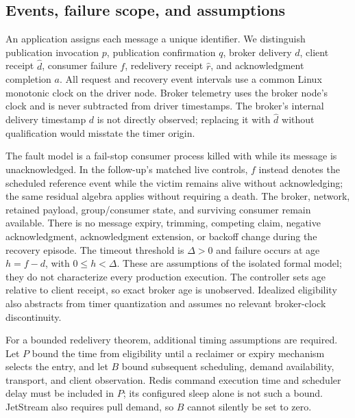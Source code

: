 \subsection{Events, failure scope, and assumptions}

An application assigns each message a unique identifier. We distinguish publication invocation $p$, publication confirmation $q$, broker delivery $d$, client receipt $\widehat d$, consumer failure $f$, redelivery receipt $\widehat r$, and acknowledgment completion $a$. All request and recovery event intervals use a common Linux monotonic clock on the driver node. Broker telemetry uses the broker node's clock and is never subtracted from driver timestamps. The broker's internal delivery timestamp $d$ is not directly observed; replacing it with $\widehat d$ without qualification would misstate the timer origin.

The fault model is a fail-stop consumer process killed with  while its message is unacknowledged. In the follow-up's matched live controls, $f$ instead denotes the scheduled reference event while the victim remains alive without acknowledging; the same residual algebra applies without requiring a death. The broker, network, retained payload, group/consumer state, and surviving consumer remain available. There is no message expiry, trimming, competing claim, negative acknowledgment, acknowledgment extension, or backoff change during the recovery episode. The timeout threshold is $\Delta>0$ and failure occurs at age $h=f-d$, with $0\leq h<\Delta$. These are assumptions of the isolated formal model; they do not characterize every production execution. The controller sets age relative to client receipt, so exact broker age is unobserved. Idealized eligibility also abstracts from timer quantization and assumes no relevant broker-clock discontinuity.

For a bounded redelivery theorem, additional timing assumptions are required. Let $P$ bound the time from eligibility until a reclaimer or expiry mechanism selects the entry, and let $B$ bound subsequent scheduling, demand availability, transport, and client observation. Redis command execution time and scheduler delay must be included in $P$; its configured sleep alone is not such a bound. JetStream also requires pull demand, so $B$ cannot silently be set to zero.

